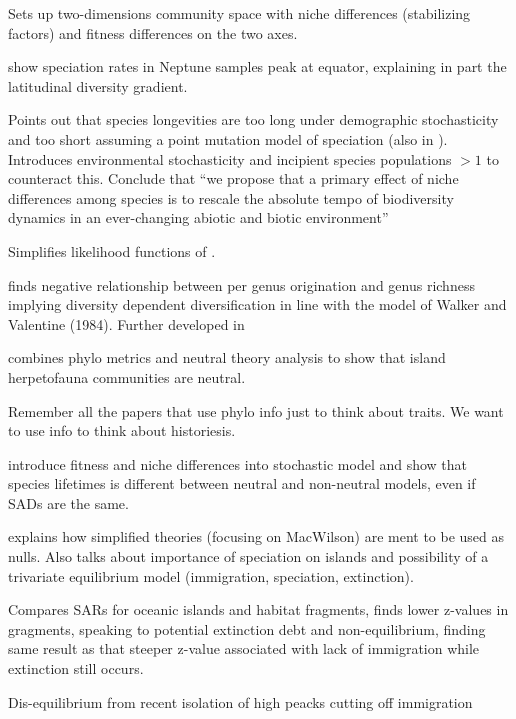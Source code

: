 \documentclass[12pt]{article}
\begin{document}
\cite{Adler2007} Sets up two-dimensions community space with niche
differences (stabilizing factors) and fitness differences on the two
axes.

\cite{Allen2006} show speciation rates in Neptune samples peak at
equator, explaining in part the latitudinal diversity gradient.

\cite{Allen2007} Points out that species longevities are too long
under demographic stochasticity and too short assuming a point
mutation model of speciation (also in \cite{Ricklefs2003,
  Ricklefs2006}).  Introduces environmental stochasticity and
incipient species populations $> 1$ to counteract this.  Conclude that
``we propose that a primary effect of niche differences among species
is to rescale the absolute tempo of biodiversity dynamics in an
ever-changing abiotic and biotic environment''

\cite{Alonso2004} Simplifies likelihood functions of
\cite{Etienne2004}.

\cite{Alroy1996} finds negative relationship between per genus
origination and genus richness implying diversity dependent
diversification in line with the model of Walker and Valentine
(1984). Further developed in \cite{Alroy1998}

\cite{Burbrink2015} combines phylo metrics and neutral theory analysis
to show that island herpetofauna communities are neutral.

Remember all the papers that use phylo info just to think about
traits.  We want to use info to think about historiesis.

\cite{Carroll2015} introduce fitness and niche differences into
stochastic model and show that species lifetimes is different between
neutral and non-neutral models, even if SADs are the same.

\cite{Heaney2000} explains how simplified theories (focusing on
MacWilson) are ment to be used as nulls.  Also talks about importance
of speciation on islands and possibility of a trivariate equilibrium
model (immigration, speciation, extinction).

\cite{Heaney1984} Compares SARs for oceanic islands and habitat
fragments, finds lower z-values in gragments, speaking to potential
extinction debt and non-equilibrium, finding same result as
\cite{Brown1971} that steeper z-value associated with lack of
immigration while extinction still occurs.

\cite{Brown1971} Dis-equilibrium from recent isolation of high peacks
cutting off immigration
\end{document}
